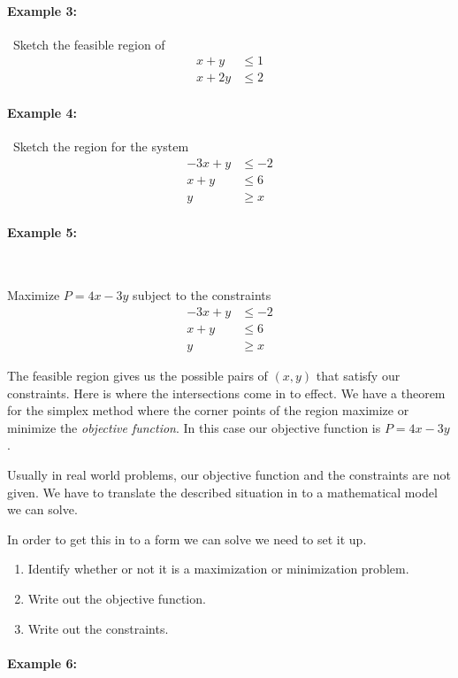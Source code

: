 \documentclass[english,12pt]{article}
\theoremstyle{plain}
\theoremstyle{definition}
\theoremstyle{definition} %
\newcommand{\enum}[1]{\begin{enumerate} #1 \end{enumerate}}
\begin{document}
\paragraph{Example 3:}\
Sketch the feasible region of 
\begin{align*}
x+y &\le 1\\
x+2y &\le 2
\end{align*}

\paragraph{Example 4:}\
Sketch the region for the system
\begin{align*}
-3x+y &\le -2\\
x+y &\le 6\\
y&\ge x
\end{align*}

\paragraph{Example 5:}\

Maximize $P=4x-3y$ subject to the constraints
\begin{align*}
-3x+y &\le -2\\
x+y &\le 6\\
y&\ge x
\end{align*}

The feasible region gives us the possible pairs of $(x,y)$ that satisfy our constraints.  Here is where the intersections come in to effect.  We have a theorem for the simplex method where the corner points of the region maximize or minimize the \emph{objective function}.  In this case our objective function is $P=4x-3y$.

Usually in real world problems, our objective function and the constraints are not given.  We have to translate the described situation in to a mathematical model we can solve.

In order to get this in to a form we can solve we need to set it up.
\enum{
\item Identify whether or not it is a maximization or minimization problem.
\item Write out the objective function.
\item Write out the constraints.
}

\paragraph{Example 6:}\
\end{document}
